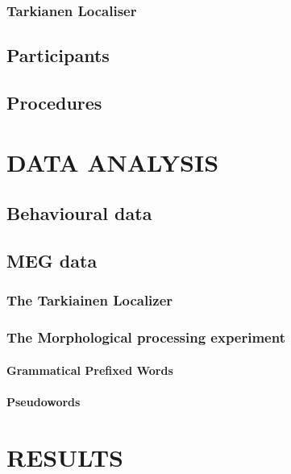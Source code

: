 \documentclass[
]{article}
\let\oldparagraph\paragraph
\renewcommand{\paragraph}[1]{\oldparagraph{#1}\mbox{}}
\begin{document}
\subsubsection{Tarkianen Localiser}\label{tarkianen-localiser}

\subsection{Participants}\label{participants}

\subsection{Procedures}\label{procedures}

\section{DATA ANALYSIS}\label{data-analysis}

\subsection{Behavioural data}\label{behavioural-data}

\subsection{MEG data}\label{meg-data}

\subsubsection{The Tarkiainen Localizer}\label{the-tarkiainen-localizer}

\subsubsection{The Morphological processing
experiment}\label{the-morphological-processing-experiment}

\paragraph{Grammatical Prefixed Words}\label{grammatical-prefixed-words}

\paragraph{Pseudowords}\label{pseudowords}

\section{RESULTS}\label{results}
\end{document}
